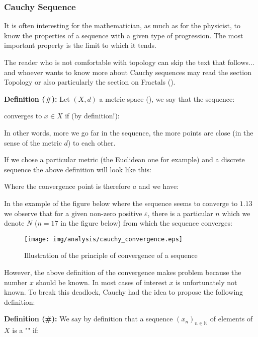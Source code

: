 	\subsubsection{Cauchy Sequence}\label{cauchy sequence}

It is often interesting for the mathematician, as much as for the physicist, to know the properties of a sequence with a given type of progression. The most important property is the limit to which it tends.

	\begin{tcolorbox}[title=Remark,colframe=black,arc=10pt]
The reader who is not comfortable with topology can skip the text that follows... and whoever wants to know more about Cauchy sequences may read the section Topology or also particularly the section on Fractals ().
	\end{tcolorbox}

\textbf{Definition (\#\mydef):} Let $(X, d)$ a metric space (), we say that the sequence:
	
converges to $x \in X$ if (by definition!):
	
In other words, more we go far in the sequence, the more points are close (in the sense of the metric $d$) to each other.

If we chose a particular metric (the Euclidean one for example) and a discrete sequence the above definition will look like this:
	
	Where the convergence point is therefore $a$ and we have:
	
	In the example of the figure below where the sequence seems to converge to $1.13$ we observe that for a given non-zero positive $\varepsilon$, there is a particular $n$ which we denote $N$ ($n=17$ in the figure below) from which the sequence converges:
	\begin{figure}[H]
		\centering
		\texttt{[image: img/analysis/cauchy\_convergence.eps]}
		\caption{Illustration of the principle of convergence of a sequence}
	\end{figure}

	However, the above definition of the convergence makes problem because the number $x$ should be known. In most cases of interest $x$ is unfortunately not known. To break this deadlock, Cauchy had the idea to propose the following definition:

	\textbf{Definition (\#\mydef):} We say by definition that a sequence $(x_n)_{n \in \mathbb{N}}$ of elements of $X$ is a "" if:
	

